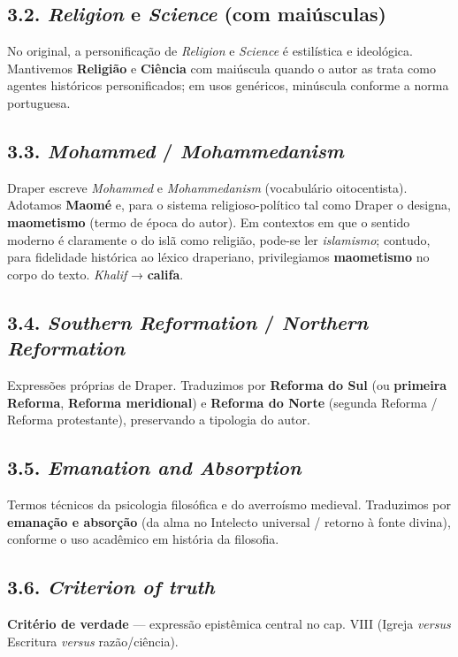 \documentclass[11pt,a5paper,twoside,openany]{book}
\begin{document}
\subsection*{3.2. \textit{Religion} e \textit{Science} (com maiúsculas)}
No original, a personificação de \textit{Religion} e \textit{Science} é estilística e ideológica. Mantivemos \textbf{Religião} e \textbf{Ciência} com maiúscula quando o autor as trata como agentes históricos personificados; em usos genéricos, minúscula conforme a norma portuguesa.

\subsection*{3.3. \textit{Mohammed} / \textit{Mohammedanism}}
Draper escreve \textit{Mohammed} e \textit{Mohammedanism} (vocabulário oitocentista). Adotamos \textbf{Maomé} e, para o sistema religioso-político tal como Draper o designa, \textbf{maometismo} (termo de época do autor). Em contextos em que o sentido moderno é claramente o do islã como religião, pode-se ler \textit{islamismo}; contudo, para fidelidade histórica ao léxico draperiano, privilegiamos \textbf{maometismo} no corpo do texto. \textit{Khalif} → \textbf{califa}.

\subsection*{3.4. \textit{Southern Reformation} / \textit{Northern Reformation}}
Expressões próprias de Draper. Traduzimos por \textbf{Reforma do Sul} (ou \textbf{primeira Reforma}, \textbf{Reforma meridional}) e \textbf{Reforma do Norte} (segunda Reforma / Reforma protestante), preservando a tipologia do autor.

\subsection*{3.5. \textit{Emanation and Absorption}}
Termos técnicos da psicologia filosófica e do averroísmo medieval. Traduzimos por \textbf{emanação e absorção} (da alma no Intelecto universal / retorno à fonte divina), conforme o uso acadêmico em história da filosofia.

\subsection*{3.6. \textit{Criterion of truth}}
\textbf{Critério de verdade} — expressão epistêmica central no cap. VIII (Igreja \textit{versus} Escritura \textit{versus} razão/ciência).
\end{document}
